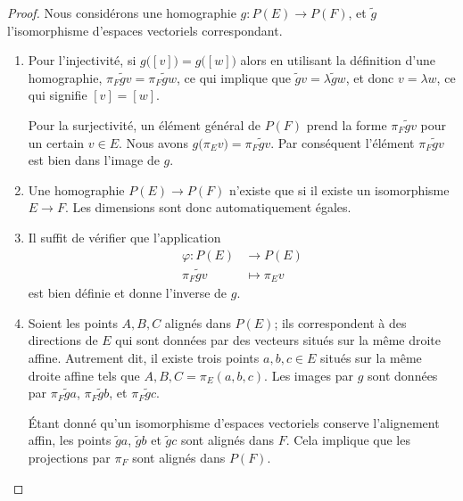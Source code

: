\begin{proof}
    Nous considérons une homographie \( g\colon P(E)\to P(F)\), et \( \tilde g\) l'isomorphisme d'espaces vectoriels correspondant.
    \begin{enumerate}
        \item
            Pour l'injectivité, si \( g\big( [v] \big)=g\big( [w] \big)\) alors en utilisant la définition d'une homographie, \( \pi_F\tilde gv=\pi_F\tilde gw\), ce qui implique que \( \tilde gv=\lambda\tilde gw\), et donc \( v=\lambda w\), ce qui signifie \( [v]=[w]\).

            Pour la surjectivité, un élément général de \( P(F)\) prend la forme \( \pi_F\tilde gv\) pour un certain \( v\in E\). Nous avons \( g\big( \pi_Ev \big)=\pi_F\tilde gv\). Par conséquent l'élément \( \pi_F\tilde gv\) est bien dans l'image de \( g\).

        \item
            Une homographie \( P(E)\to P(F)\) n'existe que si il existe un isomorphisme \( E\to F\). Les dimensions sont donc automatiquement égales.
        \item
            Il suffit de vérifier que l'application
            \begin{equation}
                \begin{aligned}
                    \varphi\colon P(E)&\to P(E) \\
                    \pi_F\tilde gv&\mapsto \pi_Ev 
                \end{aligned}
            \end{equation}
            est bien définie et donne l'inverse de \( g\).
        \item
            Soient les points \( A,B,C\) alignés dans \( P(E)\); ils correspondent à des directions de \( E\) qui sont données par des vecteurs situés sur la même droite affine. Autrement dit, il existe trois points \( a,b,c\in E\) situés sur la même droite affine tels que \( A,B,C=\pi_E(a,b,c)\). Les images par \( g\) sont données par \( \pi_F\tilde ga\), \( \pi_F\tilde gb\), et \( \pi_F\tilde gc\).

            Étant donné qu'un isomorphisme d'espaces vectoriels conserve l'alignement affin, les points \( \tilde ga\), \( \tilde gb\) et \( \tilde gc\) sont alignés dans \( F\). Cela implique que les projections par \( \pi_F\) sont alignés dans \( P(F)\).
    \end{enumerate}
\end{proof}

